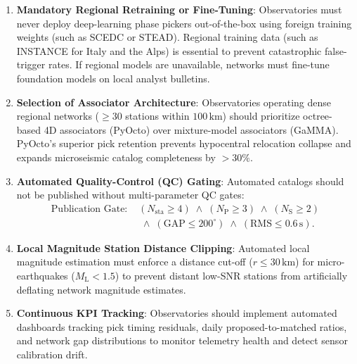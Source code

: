 \begin{enumerate}
  \item \textbf{Mandatory Regional Retraining or Fine-Tuning}:
    Observatories must never deploy deep-learning phase pickers
    out-of-the-box using foreign training weights (such as SCEDC or
    STEAD). Regional training data (such as INSTANCE for Italy and
    the Alps) is essential to prevent catastrophic false-trigger
    rates. If regional models are unavailable, networks must
    fine-tune foundation models on local analyst bulletins.
  \item \textbf{Selection of Associator Architecture}: Observatories
    operating dense regional networks ($\ge 30$ stations within
    $100\,\unit{\kilo\meter}$) should prioritize octree-based 4D
    associators (\ac{PyOcto}) over mixture-model associators
    (\ac{GaMMA}). PyOcto's superior pick retention prevents
    hypocentral relocation collapse and expands microseismic catalog
    completeness by $>30\%$.
  \item \textbf{Automated Quality-Control (QC) Gating}: Automated
    catalogs should not be published without multi-parameter QC gates:
    \begin{equation}
      \begin{aligned}
        \text{Publication Gate: } &\left( N_{\mathrm{sta}} \ge 4 \right)
        \;\land\; \left( N_{\mathrm{P}} \ge 3 \right)
        \;\land\; \left( N_{\mathrm{S}} \ge 2 \right) \\
        &\;\land\; \left( \mathrm{GAP} \le 200^\circ \right)
        \;\land\; \left( \mathrm{RMS} \le 0.6\,\unit{\second} \right).
      \end{aligned}
    \end{equation}
  \item \textbf{Local Magnitude Station Distance Clipping}:
    Automated local magnitude estimation must enforce a distance
    cut-off ($r \le 30\,\unit{\kilo\meter}$) for micro-earthquakes
    ($M_{\mathrm{L}} < 1.5$) to prevent distant low-SNR stations
    from artificially deflating network magnitude estimates.
  \item \textbf{Continuous KPI Tracking}: Observatories should
    implement automated dashboards tracking pick timing residuals,
    daily proposed-to-matched ratios, and network gap distributions
    to monitor telemetry health and detect sensor calibration drift.
\end{enumerate}

